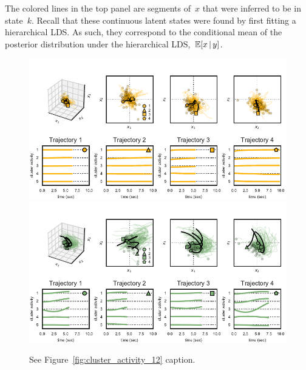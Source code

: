 \documentclass{article}
\begin{document}
The colored lines in the top panel are segments of~$x$ that were
inferred to be in state~$k$.  Recall that these continuous latent
states were found by first fitting a hierarchical LDS. As such, they
correspond to the conditional mean of the posterior
distribution under the hierarchical LDS,~$\mathbb{E}[x \,|\, y]$.

\begin{figure}[h]
\centering%
\includegraphics[width=5in]{figures/arhmm/cluster_activity_2.pdf}
\includegraphics[width=5in]{figures/arhmm/cluster_activity_3.pdf}
\caption{See Figure~\ref{fig:cluster_activity_12} caption.}
\label{fig:cluster_activity_34}
\end{figure}
\end{document}
